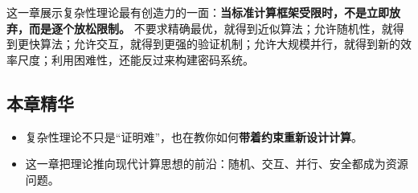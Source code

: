 这一章展示复杂性理论最有创造力的一面：\textbf{当标准计算框架受限时，不是立即放弃，而是逐个放松限制。}
不要求精确最优，就得到近似算法；允许随机性，就得到更快算法；允许交互，就得到更强的验证机制；允许大规模并行，就得到新的效率尺度；利用困难性，还能反过来构建密码系统。

\subsection{本章精华}

\begin{itemize}[leftmargin=2em]
  \item 复杂性理论不只是“证明难”，也在教你如何\textbf{带着约束重新设计计算}。
  \item 这一章把理论推向现代计算思想的前沿：随机、交互、并行、安全都成为资源问题。
\end{itemize}

\newpage

